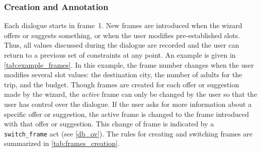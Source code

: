 \documentclass{article}
\theoremstyle{definition}
\begin{document}
\subsubsection{Creation and Annotation}
Each dialogue starts in frame~1. New frames are introduced when the wizard offers or suggests something, or when the user modifies pre-established slots. Thus, all values discussed during the dialogue are recorded and the user can return to a previous set of constraints at any point.
An example is given in \cref{tab:example_frames}. In this example, the frame number changes when the user modifies several slot values: the destination city, the number of adults for the trip, and the budget.
Though frames are created for each offer or suggestion made by the wizard, the \textit{active} frame can only be changed by the user so that the user has control over the dialogue.
If the user asks for more information about a specific offer or suggestion, the active frame is changed to the frame introduced with that offer or suggestion. This change of frame is indicated by a \texttt{switch\_frame} act (see \cref{db_ov}). 
The rules for creating and switching frames are summarized in \cref{tab:frames_creation}.
\end{document}
